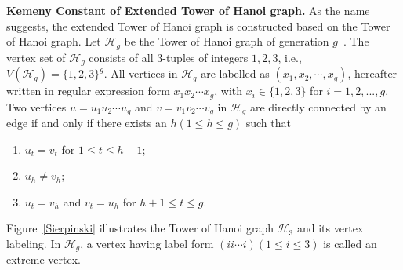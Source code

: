 \documentclass[10pt,twocolumn,twoside]{IEEEtran}
\begin{document}
\textbf{Kemeny Constant of Extended Tower of Hanoi graph.}  As the name suggests, the extended Tower of Hanoi graph is constructed  based on the Tower of Hanoi graph.  Let \(\mathcal{H}_{g}\)  be the  Tower of Hanoi graph of generation \(g\)~\cite{HiKlMiPeSt13}. The vertex set of \(\mathcal{H}_{g}\) consists of all \(3\)-tuples of integers \(1,2,3\), i.e., \(V(\mathcal{H}_{g})=\{1,2,3\}^g\). All vertices in \(\mathcal{H}_{g}\) are labelled as \((x_1,x_2,\cdots,x_g)\), hereafter written in regular expression form \(x_1x_2\cdots x_g\), with \(x_i\in\{1,2,3\}\) for \(i=1,2,...,g\). Two vertices \(u=u_1u_2\cdots u_g\) and \(v=v_1v_2\cdots v_g\) in \(\mathcal{H}_{g}\) are directly connected by an edge if and only if there exists an \(h(1\le h\le g)\) such that
\begin{enumerate}
    \item \(u_t=v_t\) for \(1\le t\le h-1\);
    \item \(u_h\neq v_h\);
    \item \(u_t=v_h\) and \(v_t=u_h\) for \(h+1\le t\le g\).
\end{enumerate}

Figure~\ref{Sierpinski} illustrates the  Tower of Hanoi graph \(\mathcal{H}_{3}\) and its vertex labeling. In \(\mathcal{H}_{g}\), a vertex having label form \((ii\cdots i)(1\le i\le 3)\) is called an extreme vertex.

\end{document}
